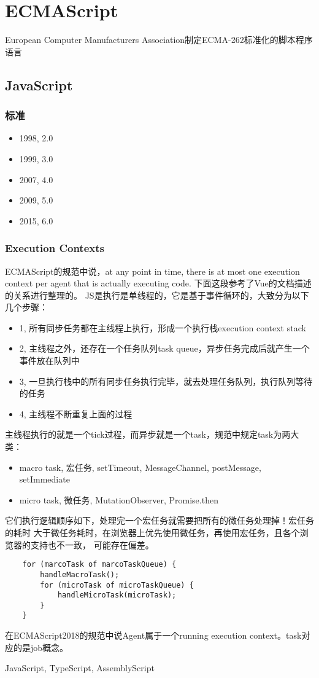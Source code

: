 \chapter{ECMAScript}

European Computer Manufacturers Association制定ECMA-262标准化的脚本程序语言

\section{JavaScript}

\subsection{标准}
\begin{itemize}
    \item {1998, 2.0}
    \item {1999, 3.0}
    \item {2007, 4.0}
    \item {2009, 5.0}
    \item {2015, 6.0}
\end{itemize}

\subsection{Execution Contexts}
ECMAScript的规范中说，at any point in time, there is at most one execution context per agent
that is actually executing code.
下面这段参考了Vue的文档描述的关系进行整理的。
JS是执行是单线程的，它是基于事件循环的，大致分为以下几个步骤：
\begin{itemize}
    \item {1, 所有同步任务都在主线程上执行，形成一个执行栈execution context stack}
    \item {2, 主线程之外，还存在一个任务队列task queue，异步任务完成后就产生一个事件放在队列中}
    \item {3, 一旦执行栈中的所有同步任务执行完毕，就去处理任务队列，执行队列等待的任务}
    \item {4, 主线程不断重复上面的过程}
\end{itemize}
主线程执行的就是一个tick过程，而异步就是一个task，规范中规定task为两大类：
\begin{itemize}
    \item {macro task, 宏任务, setTimeout, MessageChannel, postMessage, setImmediate}
    \item {micro task, 微任务, MutationObserver, Promise.then}
\end{itemize}
它们执行逻辑顺序如下，处理完一个宏任务就需要把所有的微任务处理掉！宏任务的耗时
大于微任务耗时，在浏览器上优先使用微任务，再使用宏任务，且各个浏览器的支持也不一致，
可能存在偏差。
\begin{lstlisting}
    for (marcoTask of marcoTaskQueue) {
        handleMacroTask();
        for (microTask of microTaskQueue) {
            handleMicroTask(microTask);
        }
    }
\end{lstlisting}
在ECMAScript2018的规范中说Agent属于一个running execution context。task对应的是job概念。

JavaScript, TypeScript, AssemblyScript

